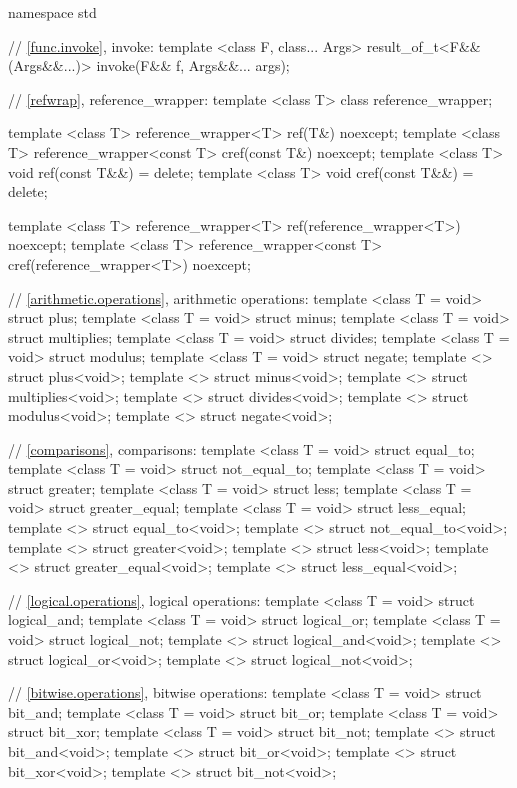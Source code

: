 %
\begin{codeblock}
namespace std {
  // \ref{func.invoke}, invoke:
  template <class F, class... Args> result_of_t<F&&(Args&&...)> invoke(F&& f, Args&&... args);

  // \ref{refwrap}, reference_wrapper:
  template <class T> class reference_wrapper;

  template <class T> reference_wrapper<T> ref(T&) noexcept;
  template <class T> reference_wrapper<const T> cref(const T&) noexcept;
  template <class T> void ref(const T&&) = delete;
  template <class T> void cref(const T&&) = delete;

  template <class T> reference_wrapper<T> ref(reference_wrapper<T>) noexcept;
  template <class T> reference_wrapper<const T> cref(reference_wrapper<T>) noexcept;

  // \ref{arithmetic.operations}, arithmetic operations:
  template <class T = void> struct plus;
  template <class T = void> struct minus;
  template <class T = void> struct multiplies;
  template <class T = void> struct divides;
  template <class T = void> struct modulus;
  template <class T = void> struct negate;
  template <> struct plus<void>;
  template <> struct minus<void>;
  template <> struct multiplies<void>;
  template <> struct divides<void>;
  template <> struct modulus<void>;
  template <> struct negate<void>;

  // \ref{comparisons}, comparisons:
  template <class T = void> struct equal_to;
  template <class T = void> struct not_equal_to;
  template <class T = void> struct greater;
  template <class T = void> struct less;
  template <class T = void> struct greater_equal;
  template <class T = void> struct less_equal;
  template <> struct equal_to<void>;
  template <> struct not_equal_to<void>;
  template <> struct greater<void>;
  template <> struct less<void>;
  template <> struct greater_equal<void>;
  template <> struct less_equal<void>;

  // \ref{logical.operations}, logical operations:
  template <class T = void> struct logical_and;
  template <class T = void> struct logical_or;
  template <class T = void> struct logical_not;
  template <> struct logical_and<void>;
  template <> struct logical_or<void>;
  template <> struct logical_not<void>;

  // \ref{bitwise.operations}, bitwise operations:
  template <class T = void> struct bit_and;
  template <class T = void> struct bit_or;
  template <class T = void> struct bit_xor;
  template <class T = void> struct bit_not;
  template <> struct bit_and<void>;
  template <> struct bit_or<void>;
  template <> struct bit_xor<void>;
  template <> struct bit_not<void>;

}
\end{codeblock}
